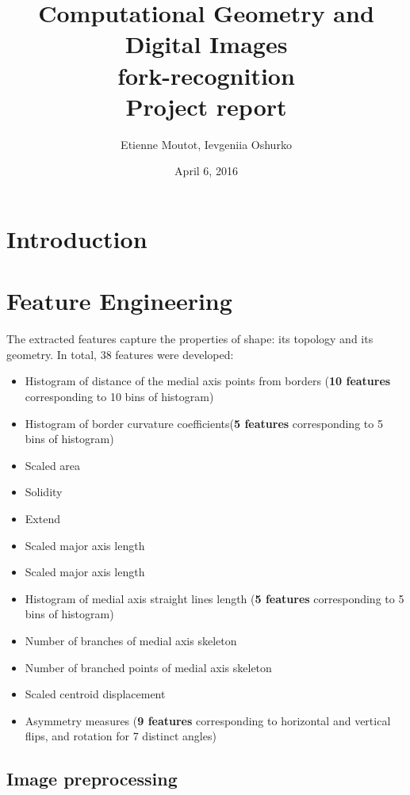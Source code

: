 \documentclass[12pt]{article}
\begin{document}
\title{
Computational Geometry and Digital Images \\
\textbf{fork-recognition}\\
Project report
}

\author{Etienne Moutot, Ievgeniia Oshurko}
\date{April 6, 2016}
\maketitle


\section{Introduction}  

\section{Feature Engineering}

The extracted features capture the properties of shape: its topology and its geometry. In total, 38 features were developed:

\begin{itemize}
	\item Histogram of distance of the medial axis points from borders (\textbf{10 features} corresponding to 10 bins of histogram)
	\item Histogram of border curvature coefficients(\textbf{5 features} corresponding to 5 bins of histogram)
	\item Scaled area
	\item Solidity
	\item Extend
	\item Scaled major axis length
	\item Scaled major axis length
	\item Histogram of medial axis straight lines length (\textbf{5 features} corresponding to 5 bins of histogram)
	\item Number of branches of medial axis skeleton
	\item Number of branched points of medial axis skeleton
	\item Scaled centroid displacement
	\item Asymmetry measures (\textbf{9 features} corresponding to horizontal and vertical flips, and rotation for 7 distinct angles)
\end{itemize} 

\subsection{Image preprocessing}
\end{document}
